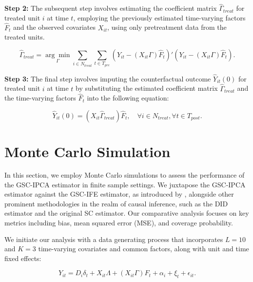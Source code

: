 \documentclass[12pt]{article}
\begin{document}
\textbf{Step 2:} The subsequent step involves estimating the coefficient matrix $\hat{\Gamma}_{treat}$ for treated unit $i$ at time $t$, employing the previously estimated time-varying factors $\hat{F}_t$ and the observed covariates $X_{it}$, using only pretreatment data from the treated units.

\begin{equation}
\hat{\Gamma}_{treat} = \underset{\Gamma}{\arg\min} \sum_{i \in N_{treat}} \sum_{t \in T_{pre}} \left( Y_{it} - (X_{it} \Gamma) \hat{F}_{t} \right)' \left( Y_{it} - (X_{it} \Gamma) \hat{F}_{t} \right).
\tag{4}
\end{equation}

\textbf{Step 3:} The final step involves imputing the counterfactual outcome $\hat{Y}_{it}(0)$ for treated unit $i$ at time $t$ by substituting the estimated coefficient matrix $\hat{\Gamma}_{treat}$ and the time-varying factors $\hat{F}_t$ into the following equation:

\begin{equation}
\hat{Y}_{it}(0) = (X_{it} \hat{\Gamma}_{treat}) \hat{F}_{t}, \quad \forall i \in N_{treat}, \forall t \in T_{post}.
\tag{5}
\end{equation}
\section{Monte Carlo Simulation}
\label{sec: simulation}

In this section, we employ Monte Carlo simulations to assess the performance of the GSC-IPCA estimator in finite sample settings. We juxtapose the GSC-IPCA estimator against the GSC-IFE estimator, as introduced by \cite{xu2017generalized}, alongside other prominent methodologies in the realm of causal inference, such as the DID estimator and the original SC estimator. Our comparative analysis focuses on key metrics including bias, mean squared error (MSE), and coverage probability. 

We initiate our analysis with a data generating process that incorporates $L=10$ and $K=3$ time-varying covariates and common factors, along with unit and time fixed effects:

\begin{equation}
Y_{it} = D_{i} \delta_{t} + X_{it}\Lambda + (X_{it}\Gamma) F_{t} + \alpha_i + \xi_t + \epsilon_{it}.
\tag{6}
\label{eq: dgp}
\end{equation}
\end{document}
